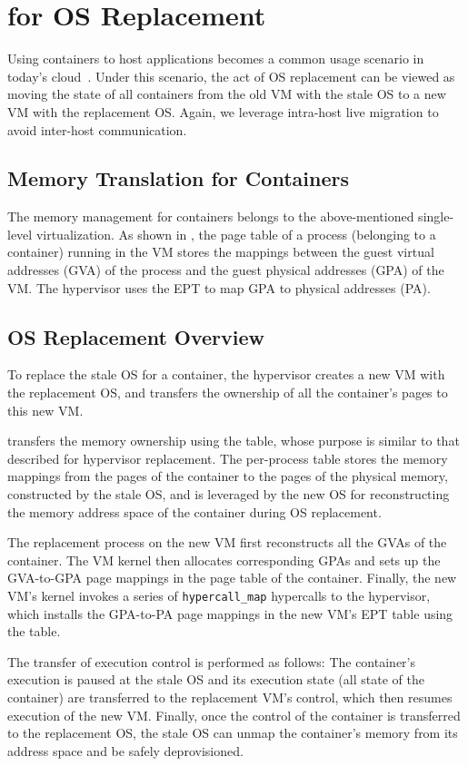 \section{\arch for OS Replacement}
Using containers to host applications becomes a common usage scenario 
in today's cloud~\cite{aws, gcpkubernetes, azureks, ibmkubernetes, vmwarepks}. 
Under this scenario, the act of OS replacement can be viewed as 
moving the state of all containers from the old VM with the 
stale OS to a new VM with the replacement OS. Again, we leverage 
intra-host live migration to avoid inter-host communication.

\subsection{Memory Translation for Containers}
The memory management for containers belongs to the above-mentioned single-level virtualization. As shown in , the page table of a process (belonging to a container) running in the VM stores the mappings between the guest virtual addresses (GVA) of the process and the guest physical addresses (GPA) of the VM. The hypervisor uses the EPT to map GPA to physical addresses (PA). 

\subsection{OS Replacement Overview}
To replace the stale OS for a container, the hypervisor creates a new VM with the replacement OS, and transfers the ownership of all the container's pages to this new VM.

\arch transfers the memory ownership using the \arch table, whose purpose is similar to that described for hypervisor replacement.
The  per-process \arch table stores the memory mappings from the pages of the container to the  pages of the physical memory, constructed by the stale OS, and is leveraged by the new OS for reconstructing the 
memory address space of the container during OS replacement. 

The replacement process on the new VM first reconstructs all the GVAs of the container. The VM kernel then allocates corresponding GPAs and sets up the GVA-to-GPA page mappings in the page table of the container. Finally, the new VM's kernel invokes a series of \texttt{hypercall\_map} hypercalls to the hypervisor, which installs the GPA-to-PA page mappings in the new VM's EPT table using the \arch table.

The transfer of execution control is performed as follows:
The container's execution is paused at the stale OS
and its execution state (all state of the container) 
are transferred to the replacement VM's control, which then resumes execution of the new VM. Finally, once the control of the container is transferred to the replacement OS, 
the stale OS can unmap the container's memory from its address space and be safely deprovisioned. 

